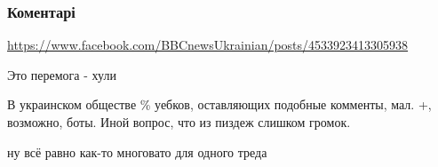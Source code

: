  
 
 
 
 
\subsubsection{Коментарі}
\label{sec:13_08_2021.fb.uljanov_anatolij.1.kamchatka_katastrofa.cmt}

\begin{itemize}
 
\url{https://www.facebook.com/BBCnewsUkrainian/posts/4533923413305938}

 
Это перемога - хули

 
В украинском обществе \% уебков, оставляющих подобные комменты, мал. +, возможно, боты. Иной вопрос, что из пиздеж слишком громок.

\begin{itemize}
 
ну всё равно как-то многовато для одного треда

 

\end{itemize}
\end{itemize}
